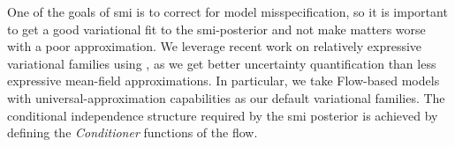 



One of the goals of \acrshort*{smi} is to correct for model misspecification, so it is important to get a good variational fit to the \acrshort*{smi}-posterior and not make matters worse with a poor approximation.
We leverage recent work on relatively expressive variational families using  \citep{Rezende2015nf, Papamakarios2021normalizing}, as we get better uncertainty quantification than less expressive mean-field approximations.
In particular, we take Flow-based models with universal-approximation capabilities \citep[see][]{Huang2018flows,Durkan2019neural,Papamakarios2021normalizing} as our default variational families.
The conditional independence structure required by the \acrshort*{smi} posterior is achieved by defining the \emph{Conditioner} functions of the flow.

